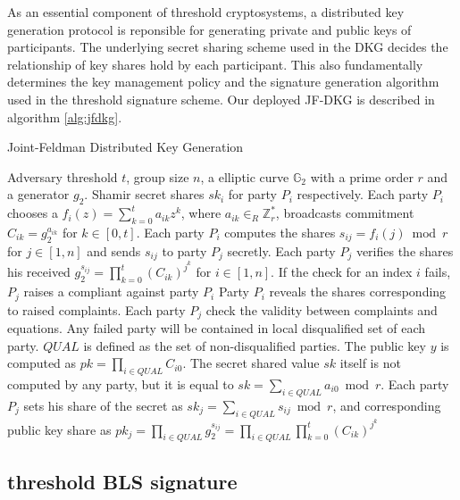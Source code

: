 \documentclass[11pt]{article}
\begin{document}
As an essential component of threshold cryptosystems, a distributed key generation protocol is reponsible for generating private and public keys of participants. The underlying secret sharing scheme used in the DKG decides the relationship of key shares hold by each participant. This also fundamentally determines the key management policy and the signature generation algorithm used in the threshold signature scheme. Our deployed JF-DKG is described in algorithm \ref{alg:jfdkg}.

\begin{algorithm}
\caption{Joint-Feldman Distributed Key Generation \cite{gennaro2007secure}}\label{alg:jfdkg}
\begin{algorithmic}[1]
\Require Adversary threshold $t$, group size $n$, a elliptic curve $\mathbb{G}_2$ with a prime order $r$ and a generator $g_2$.
\Ensure Shamir secret shares $sk_i$ for party $P_i$ respectively.
\State Each party $P_i$ chooses a $f_i(z) = \sum_{k=0}^t a_{ik}z^{k}$, where $a_{ik} \in_R \mathbb{Z}_r^*$, broadcasts commitment $C_{ik} = g_2^{a_{ik}}$ for $k \in [0,t]$. Each party $P_i$ computes the shares $s_{ij} = f_i(j) \bmod r$ for $j \in [1,n]$ and sends $s_{ij}$ to party $P_j$ secretly.
\State Each party $P_j$ verifies the shares his received $g_2^{s_{ij}} = \prod_{k=0}^t(C_{ik})^{j^k}$ for $i \in [1,n]$. If the check for an index $i$ fails, $P_j$ raises a compliant against party $P_i$
\State Party $P_i$ reveals the shares corresponding to raised complaints. Each party $P_j$ check the validity between complaints and equations. Any failed party will be contained in local disqualified set of each party. $QUAL$ is defined as the set of non-disqualified parties.
\State The public key $y$ is computed as $pk = \prod_{i\in QUAL} C_{i0}$. The secret shared value $sk$ itself is not computed by any party, but it is equal to $sk = \sum_{i \in QUAL} a_{i0} \bmod r$. Each party $P_j$ sets his share of the secret as $sk_j = \sum_{i\in QUAL} s_{ij} \bmod r$, and corresponding public key share as $pk_j = \prod_{i \in QUAL} g_2^{s_{ij}} = \prod_{i \in QUAL} \prod_{k=0}^t (C_{ik})^{j^k}$
\end{algorithmic}
\end{algorithm}

\subsection{threshold BLS signature}
\end{document}
